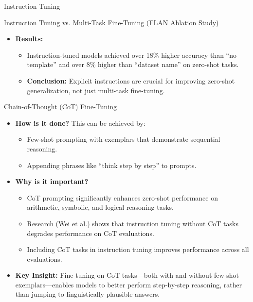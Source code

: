 \begin{frame}[allowframebreaks]{Instruction Tuning}
\begin{block}{Instruction Tuning vs. Multi-Task Fine-Tuning (FLAN Ablation Study)}
\begin{itemize}
\begin{itemize}
                \item \textit{FLAN Instructions:} Full natural language instruction, e.g., ``Please translate this sentence to French: 'The dog runs.' ''
            \end{itemize}
            \item \textbf{Results:}
            \begin{itemize}
                \item Instruction-tuned models achieved over 18\% higher accuracy than ``no template'' and over 8\% higher than ``dataset name'' on zero-shot tasks.
                \item \textbf{Conclusion:} Explicit instructions are crucial for improving zero-shot generalization, not just multi-task fine-tuning.
            \end{itemize}
        \end{itemize}
    \end{block}
    \framebreak
    \begin{block}{Chain-of-Thought (CoT) Fine-Tuning}
        \begin{itemize}
            \item \textbf{How is it done?} This can be achieved by:
            \begin{itemize}
                \item Few-shot prompting with exemplars that demonstrate sequential reasoning.
                \item Appending phrases like ``think step by step'' to prompts.
            \end{itemize}
            \item \textbf{Why is it important?}
            \begin{itemize}
                \item CoT prompting significantly enhances zero-shot performance on arithmetic, symbolic, and logical reasoning tasks.
                \item Research (Wei et al.) shows that instruction tuning without CoT tasks degrades performance on CoT evaluations.
                \item Including CoT tasks in instruction tuning improves performance across all evaluations.
            \end{itemize}
            \item \textbf{Key Insight:} Fine-tuning on CoT tasks—both with and without few-shot exemplars—enables models to better perform step-by-step reasoning, rather than jumping to linguistically plausible answers.

\end{itemize}
\end{block}
\end{frame}
